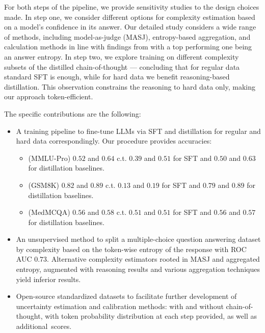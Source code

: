For both steps of the pipeline, we provide sensitivity studies to the design choices made.
In step one, we consider different options for complexity estimation based on a model's confidence in its answer. 
Our detailed study considers a wide range of methods, including model-as-judge (MASJ), entropy-based aggregation, and calculation methods in line with findings from \citet{fadeeva2023lmpolygraphuncertaintyestimationlanguage} with a top performing one being an answer entropy.
In step two, we explore training on different complexity subsets of the distilled chain-of-thought --- concluding that for regular data standard SFT is enough, while for hard data we benefit reasoning-based distillation.
This observation constrains the reasoning to hard data only, making our approach token-efficient. 

The specific contributions are the following:
\label{sec:contributions}
\begin{itemize}
    \item A training pipeline to fine-tune LLMs via SFT and distillation for regular and hard data correspondingly. Our procedure provides accuracies: 
    \begin{itemize}
        \item (MMLU-Pro) $0.52$ and $0.64$ c.t. $0.39$ and $0.51$ for SFT and $0.50$ and $0.63$ for distillation baselines.
        \item (GSM8K) $0.82$ and $0.89$ c.t. $0.13$ and $0.19$ for SFT and $0.79$ and $0.89$ for distillation baselines.
        \item (MedMCQA) $0.56$ and $0.58$ c.t. $0.51$ and $0.51$ for SFT and $0.56$ and $0.57$ for distillation baselines.
    \end{itemize}
    \item An unsupervised method to split a multiple-choice question answering dataset by complexity based on the token-wise entropy of the response with ROC AUC $0.73$. Alternative complexity estimators rooted in MASJ and aggregated entropy, augmented with reasoning results and various aggregation techniques yield inferior results.
    \item Open-source standardized datasets %
    to facilitate further development of uncertainty estimation and calibration methods: with and without chain-of-thought, with token probability distribution at each step provided, as well as additional~scores.
\end{itemize}
